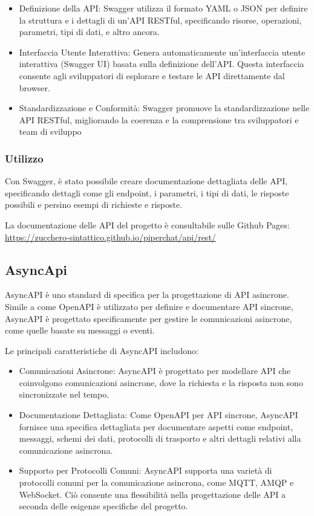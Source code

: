 \begin{itemize}
    \item Definizione della API: Swagger utilizza il formato YAML o JSON per definire la struttura e i dettagli di un'API RESTful, specificando risorse, operazioni, parametri, tipi di dati, e altro ancora.
    
    \item Interfaccia Utente Interattiva: Genera automaticamente un'interfaccia utente interattiva (Swagger UI) basata sulla definizione dell'API. Questa interfaccia consente agli sviluppatori di esplorare e testare le API direttamente dal browser.

    \item Standardizzazione e Conformità: Swagger promuove la standardizzazione nelle API RESTful, migliorando la coerenza e la comprensione tra sviluppatori e team di sviluppo
\end{itemize}

\subsubsection{Utilizzo}

Con Swagger, è stato possibile creare documentazione dettagliata delle API, specificando dettagli come gli endpoint, i parametri, i tipi di dati, le risposte possibili e persino esempi di richieste e risposte.

La documentazione delle API del progetto è consultabile sulle Github Pages:
\url{https://zucchero-sintattico.github.io/piperchat/api/rest/}

%
%
%
\subsection{AsyncApi}

AsyncAPI è uno standard di specifica per la progettazione di API asincrone.
%
Simile a come OpenAPI è utilizzato per definire e documentare API sincrone, AsyncAPI è progettato specificamente per gestire le comunicazioni asincrone, come quelle basate su messaggi o eventi.

Le principali caratteristiche di AsyncAPI includono:

\begin{itemize}
    \item Comunicazioni Asincrone: AsyncAPI è progettato per modellare API che coinvolgono comunicazioni asincrone, dove la richiesta e la risposta non sono sincronizzate nel tempo.

    \item Documentazione Dettagliata: Come OpenAPI per API sincrone, AsyncAPI fornisce una specifica dettagliata per documentare aspetti come endpoint, messaggi, schemi dei dati, protocolli di trasporto e altri dettagli relativi alla comunicazione asincrona.

    \item Supporto per Protocolli Comuni: AsyncAPI supporta una varietà di protocolli comuni per la comunicazione asincrona, come MQTT, AMQP e WebSocket. Ciò consente una flessibilità nella progettazione delle API a seconda delle esigenze specifiche del progetto.
\end{itemize}

